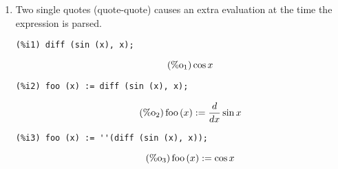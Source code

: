\documentclass[12pt,leqno]{article}
\begin{document}
\begin{enumerate}
\item Two single quotes (quote-quote) causes an extra evaluation at the time the expression is parsed.
\begin{verbatim}
(%i1) diff (sin (x), x);
\end{verbatim}
\begin{equation}
\tag{$\mathop{\mathrm{\%o}_{1}}$}\cos x
\label{eq:doc-group1-code17-1-1}
\end{equation}
\begin{verbatim}
(%i2) foo (x) := diff (sin (x), x);
\end{verbatim}
\begin{equation}
\tag{$\mathop{\mathrm{\%o}_{2}}$}\mathop{\mathrm{foo}}\left(x\right) := \frac{d}{d x}\sin x
\label{eq:doc-group1-code17-2-1}
\end{equation}
\begin{verbatim}
(%i3) foo (x) := ''(diff (sin (x), x));
\end{verbatim}
\begin{equation}
\tag{$\mathop{\mathrm{\%o}_{3}}$}\mathop{\mathrm{foo}}\left(x\right) := \cos x
\label{eq:doc-group1-code17-3-1}
\end{equation}



\end{enumerate}
\end{document}
